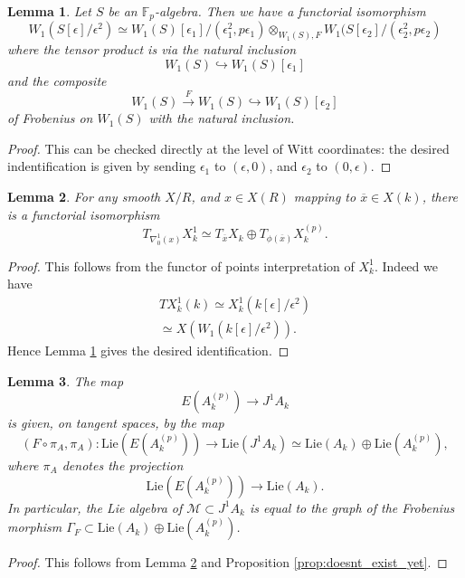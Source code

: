 \documentclass[11pt]{amsart}
\newcommand{\Lie}{\mathrm{Lie}}
\theoremstyle{plain}
\newtheorem{lemma}{Lemma}
\theoremstyle{definition}
\newcommand{\F}{\mathbb{F}}
\begin{document}
\begin{lemma}\label{lemma:witt}
Let $S$ be an $\F_p $-algebra. Then we have a functorial isomorphism
\[
W_1 (S[\epsilon ]/\epsilon ^2 ) \simeq W_1 (S)[\epsilon _1 ]/(\epsilon _1 ^2 ,p\epsilon _1 )\otimes _{W_1 (S),F }W_1 (S[\epsilon _2 ]/(\epsilon _2 ^2 ,p\epsilon _2 )
\]
where the tensor product is via the natural inclusion 
\[
W_1 (S)\hookrightarrow W_1 (S)[\epsilon _1 ]
\]
and the composite
\[
W_1 (S)\stackrel{F}{\longrightarrow }W_1 (S)\hookrightarrow W_1 (S)[\epsilon _2 ]
\]
of Frobenius on $W_1 (S)$ with the natural inclusion.
\end{lemma}
\begin{proof}
This can be checked directly at the level of Witt coordinates: the desired indentification is given by sending $\epsilon _1 $ to $(\epsilon ,0)$, and $\epsilon _2 $ to $(0,\epsilon )$.
\end{proof}
\begin{lemma}\label{lemma:nice}
For any smooth $X/R$, and $x\in X(R)$ mapping to $\overline{x}\in X(k)$, there is a functorial isomorphism
\[
T_{\nabla ^1 _0 (x)}X_k ^1 \simeq T_{\overline{x}}X_k \oplus T_{\phi (\overline{x})}X_k ^{(p)}.
\]
\end{lemma}
\begin{proof}
This follows from the functor of points interpretation of $X_k ^1$. Indeed we have
\begin{align*}
TX_k ^1 (k)\simeq X_k ^1 (k[\epsilon ]/\epsilon ^2 ) \\
\simeq X(W_1 (k[\epsilon ]/\epsilon ^2 )).
\end{align*}
Hence Lemma \ref{lemma:witt} gives the desired identification.
\end{proof}

\begin{lemma}\label{lemma:imageM}
The map
\[
E(A^{(p)}_k )\to J^1 A_k 
\]
is given, on tangent spaces, by the map
\[
(F\circ \pi _A ,\pi _A ):\Lie (E(A^{(p)}_k ))\to \Lie (J^1 A_k )\simeq \Lie (A_k )\oplus \Lie (A_k ^{(p)}),
\]
where $\pi _A$ denotes the projection
\[
\Lie (E(A^{(p)}_k ))\to \Lie (A_k ).
\]
In particular, the Lie algebra of $\mathcal{M}\subset J^1 A_k $ is equal to the graph of the Frobenius morphism $\Gamma _F \subset \Lie (A_k )\oplus \Lie (A_k ^{(p)})$.
\end{lemma}
\begin{proof}
This follows from Lemma \ref{lemma:nice} and Proposition \ref{prop:doesnt_exist_yet}.
\end{proof}
\end{document}
